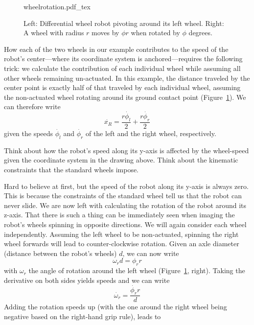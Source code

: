 \begin{figure}[htb!]
    \centering
    \def\svgwidth{0.86\textwidth}
    {wheelrotation.pdf_tex}
    \caption{Left: Differential wheel robot pivoting around its left wheel. Right: A wheel with radius $r$ moves by $\phi r$ when rotated by $\phi$ degrees.}
    \label{fig:wheelrotation}
\end{figure}



How each of the two wheels in our example contributes to the speed of the robot's center---where its coordinate system is anchored---requires the following trick: we calculate the contribution of each individual wheel while assuming all other wheels remaining un-actuated. In this example, the distance traveled by the center point is exactly half of that traveled by each individual wheel, assuming the non-actuated wheel rotating around its ground contact point (Figure~\ref{fig:wheelrotation}). We can therefore write
\begin{equation}
\dot{x_R}=\frac{r\dot{\phi_l}}{2}+\frac{r\dot{\phi_r}}{2}
\end{equation}
given the speeds $ \dot{\phi_l}$ and $ \dot{\phi_r}$ of the left and the right wheel, respectively.

\begin{framed}
Think about how the robot's speed along its y-axis is affected by the wheel-speed given the coordinate system in the drawing above. Think about the kinematic constraints that the standard wheels impose.
\end{framed}

Hard to believe at first, but the speed of the robot along its y-axis is always zero. This is because the constraints of the standard wheel tell us that the robot can never slide.  We are now left with calculating the rotation of the robot around its z-axis. That there is such a thing can be immediately seen when imaging the robot's wheels spinning in opposite directions. We will again consider each wheel independently. Assuming the left wheel to be non-actuated, spinning the right wheel forwards will lead to counter-clockwise rotation. Given an axle diameter (distance between the robot's wheels) $d$, we can now write
\begin{equation}
\omega_r d = \phi_r r
\end{equation}
with $\omega_r$ the angle of rotation around the left wheel (Figure~\ref{fig:wheelrotation}, right). Taking the derivative on both sides yields speeds and we can write
\begin{equation}
\dot{\omega_r} = \frac{\dot{\phi_r} r}{d}
\end{equation}
Adding the rotation speeds up (with the one around the right wheel being negative based on the right-hand grip rule), leads to

